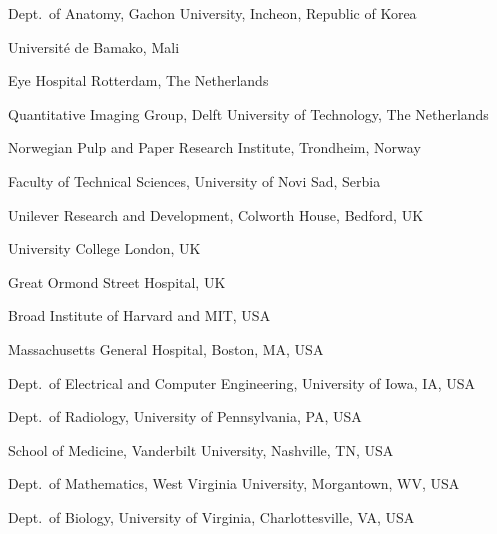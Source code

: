 {\begin{trivlist}
\item Dept.~of Anatomy, Gachon University, Incheon, Republic of Korea
\item Universit\' e de Bamako, Mali
\item Eye Hospital Rotterdam, The Netherlands
\item Quantitative Imaging Group, Delft University of Technology, The Netherlands
\item Norwegian Pulp and Paper Research Institute, Trondheim, Norway
\item Faculty of Technical Sciences, University of Novi Sad, Serbia
\item Unilever Research and Development, Colworth House, Bedford, UK
\item University College London, UK
\item Great Ormond Street Hospital, UK
\item Broad Institute of Harvard and MIT, USA
\item Massachusetts General Hospital, Boston, MA, USA
\item Dept.~of Electrical and Computer Engineering, University of Iowa, IA, USA
\item Dept.~of Radiology, University of Pennsylvania, PA, USA
\item School of Medicine, Vanderbilt University, Nashville, TN, USA  
\item Dept.~of Mathematics, West Virginia University, Morgantown, WV, USA
\item Dept.~of Biology, University of Virginia, Charlottesville, VA, USA


\end{trivlist}
}

\addtolength\textheight{1ex}
